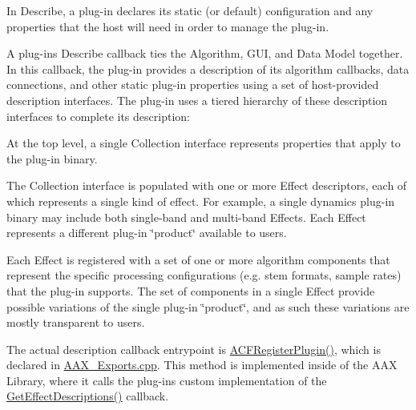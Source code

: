  In Describe, a plug-\/in declares its static (or default) configuration and any properties that the host will need in order to manage the plug-\/in.

 A plug-\/in\textquotesingle{}s Describe callback ties the Algorithm, G\+UI, and Data Model together. In this callback, the plug-\/in provides a description of its algorithm callbacks, data connections, and other static plug-\/in properties using a set of host-\/provided description interfaces. The plug-\/in uses a tiered hierarchy of these description interfaces to complete its description\+: 
\begin{DoxyItemize}
\item At the top level, a single Collection interface represents properties that apply to the plug-\/in binary.  
\item The Collection interface is populated with one or more Effect descriptors, each of which represents a single kind of effect. For example, a single dynamics plug-\/in binary may include both single-\/band and multi-\/band Effects. Each Effect represents a different plug-\/in \char`\"{}product\char`\"{} available to users.  
\item Each Effect is registered with a set of one or more algorithm components that represent the specific processing configurations (e.\+g. stem formats, sample rates) that the plug-\/in supports. The set of components in a single Effect provide possible variations of the single plug-\/in \char`\"{}product\char`\"{}, and as such these variations are mostly transparent to users.  
\end{DoxyItemize}

 The actual description callback entrypoint is \mbox{\hyperlink{a00500_aa455fa4d9a2236334d0fd959b4919788}{A\+C\+F\+Register\+Plugin()}}, which is declared in \mbox{\hyperlink{a00500}{A\+A\+X\+\_\+\+Exports.\+cpp}}. This method is implemented inside of the A\+AX Library, where it calls the plug-\/in\textquotesingle{}s custom implementation of the \mbox{\hyperlink{a00796_gae0d356eef326f77cbb972e48946d4892}{Get\+Effect\+Descriptions()}} callback.


